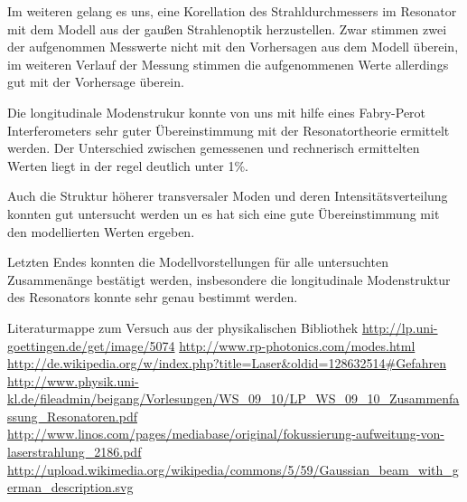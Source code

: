 \documentclass[bigchapter,colorback,accentcolor=tud4b,linedtoc,11pt]{tudreport}
\numberwithin{equation}{subsection}
\begin{document}
Im weiteren gelang es uns, eine Korellation des Strahldurchmessers im Resonator mit dem Modell aus der gaußen Strahlenoptik herzustellen. Zwar stimmen zwei der aufgenommen Messwerte nicht mit den Vorhersagen aus dem Modell überein, im weiteren Verlauf der Messung stimmen die aufgenommenen Werte allerdings gut mit der Vorhersage überein.

Die longitudinale Modenstrukur konnte von uns mit hilfe eines Fabry-Perot Interferometers sehr guter Übereinstimmung mit der Resonatortheorie ermittelt werden. Der Unterschied zwischen gemessenen und rechnerisch ermittelten Werten liegt in der regel deutlich unter 1\%.

Auch die Struktur höherer transversaler Moden und deren Intensitätsverteilung konnten gut untersucht werden un es hat sich eine gute Übereinstimmung mit den modellierten Werten ergeben.

Letzten Endes konnten die Modellvorstellungen für alle untersuchten Zusammenänge bestätigt werden, insbesondere die longitudinale Modenstruktur des Resonators konnte sehr genau bestimmt werden.

\cleardoublepage{}
\newpage
\begin{thebibliography}{100}
   Literaturmappe zum Versuch aus der physikalischen Bibliothek
   \url{http://lp.uni-goettingen.de/get/image/5074}
   \url{http://www.rp-photonics.com/modes.html}
   \url{http://de.wikipedia.org/w/index.php?title=Laser&oldid=128632514#Gefahren}
   \url{http://www.physik.uni-kl.de/fileadmin/beigang/Vorlesungen/WS_09_10/LP_WS_09_10_Zusammenfassung_Resonatoren.pdf}
   \url{http://www.linos.com/pages/mediabase/original/fokussierung-aufweitung-von-laserstrahlung_2186.pdf}
   \url{http://upload.wikimedia.org/wikipedia/commons/5/59/Gaussian_beam_with_german_description.svg}
\end{thebibliography}

\cleardoublepage{}
\end{document}
